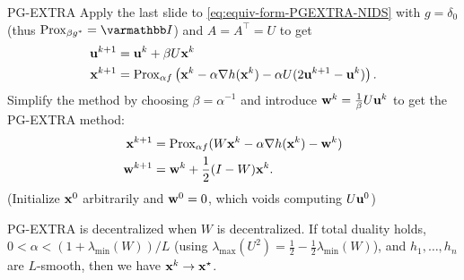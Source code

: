 \documentclass[10pt,mathserif]{beamer}
\begin{document}
\begin{frame}{PG-EXTRA}
  Apply the last slide to \eqref{eq:equiv-form-PGEXTRA-NIDS} with $g=\delta_{0}$ (thus $\prox_{\beta g^*}=\opI$) and $A=A^\intercal=U$ to get
  \begin{align*}
    {\mathbf{u}}^{k+1} & = {\mathbf{u}}^k + \beta U {\mathbf{x}}^k\\
    {\mathbf{x}}^{k+1} &= \mathrm{Prox}_{\alpha f}\left({\mathbf{x}}^k - \alpha \nabla h({\mathbf{x}}^k) - \alpha U(2 {\mathbf{u}}^{k+1}-{\mathbf{u}}^k)\right).
  \end{align*}
  Simplify the method by choosing $\beta=\alpha^{-1}$ and introduce ${\mathbf{w}}^k=\frac{1}{\beta}U{\mathbf{u}}^k$ to get the PG-EXTRA method:
  \begin{align*}
    {\mathbf{x}}^{k+1} & =\mathrm{Prox}_{\alpha f}(W{\mathbf{x}}^k - \alpha \nabla h({\mathbf{x}}^k) - {\mathbf{w}}^k)\\
    {\mathbf{w}}^{k+1} & = {\mathbf{w}}^k + \frac{1}{2}(I-W){\mathbf{x}}^k.
  \end{align*}
  (Initialize ${\mathbf{x}}^0$
  arbitrarily and ${\mathbf{w}}^0=0$, which voids computing $U{\mathbf{u}}^0$)
  \medskip
  
  PG-EXTRA is decentralized when $W$ is decentralized. If total duality holds,  $0<\alpha < (1+\lambda_{\min}(W))/L$ (using $\lambda_{\max}(U^2)=\frac{1}{2}-\frac{1}{2}\lambda_{\min}(W)$), and $h_1,\dots,h_n$ are $L$-smooth, then we have ${\mathbf{x}}^k\to{\mathbf{x}}^\star$.
\end{frame}

\end{document}
